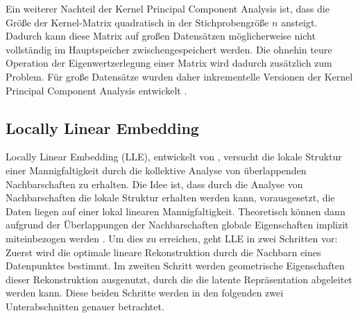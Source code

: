 Ein weiterer Nachteil der Kernel Principal Component Analysis ist, dass die Größe der Kernel-Matrix
quadratisch in der Stichprobengröße $n$ ansteigt. Dadurch kann diese Matrix auf großen Datensätzen
möglicherweise nicht vollständig im Hauptspeicher zwischengespeichert werden. Die ohnehin teure
Operation der Eigenwertzerlegung einer Matrix wird dadurch zusätzlich zum Problem. Für große
Datensätze wurden daher inkrementelle Versionen der Kernel Principal Component Analysis entwickelt \parencite[siehe z.B.][]{Hallgren.2018}.

\subsection{Locally Linear Embedding}
\label{ch:MethodenDerDimRed:statistisch:LLE}
Locally Linear Embedding (LLE), entwickelt von \textcite{Roweis.2000}, versucht die lokale Struktur einer Mannigfaltigkeit durch die kollektive Analyse von überlappenden Nachbarschaften zu erhalten. Die Idee ist, dass durch die Analyse von Nachbarschaften die lokale Struktur erhalten werden kann, vorausgesetzt, die Daten liegen auf einer lokal linearen Mannigfaltigkeit. Theoretisch können dann aufgrund der Überlappungen der Nachbarschaften globale Eigenschaften implizit miteinbezogen werden \parencite[2325]{Roweis.2000}. Um dies zu erreichen, geht LLE in zwei Schritten vor: Zuerst wird die
optimale lineare Rekonstruktion durch die Nachbarn eines Datenpunktes bestimmt. Im zweiten Schritt
werden geometrische Eigenschaften dieser Rekonstruktion ausgenutzt, durch die die latente
Repräsentation abgeleitet werden kann. Diese beiden Schritte werden in den folgenden zwei
Unterabschnitten genauer betrachtet.

